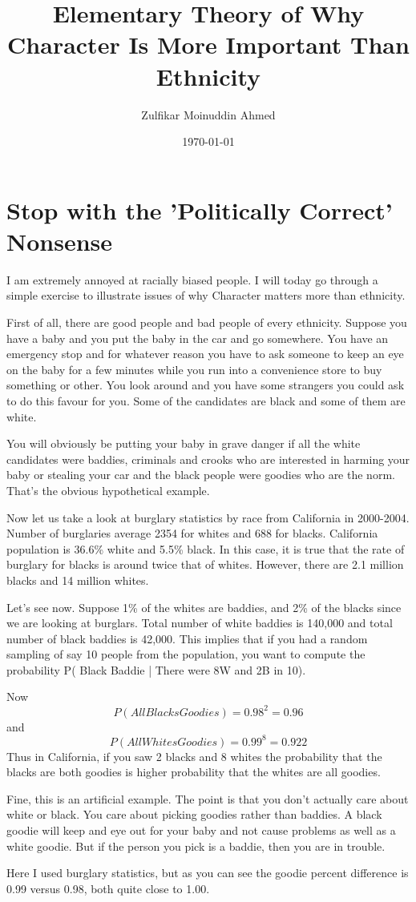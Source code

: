 \documentclass{amsart}
\title{Elementary Theory of Why Character Is More Important Than Ethnicity}
\author{Zulfikar Moinuddin Ahmed}
\date{\today}
\begin{document}
\maketitle

\section{Stop with the 'Politically Correct' Nonsense}

I am extremely annoyed at racially biased people.  I will today go through a simple exercise to illustrate issues of why Character matters more than ethnicity.

First of all, there are good people and bad people of every ethnicity.  Suppose you have a baby and you put the baby in the car and go somewhere.  You have an emergency stop and for whatever reason you have to ask someone to keep an eye on the baby for a few minutes while you run into a convenience store to buy something or other.  You look around and you have some strangers you could ask to do this favour for you.  Some of the candidates are black and some of them are white.  

You will obviously be putting your baby in grave danger if all the white candidates were baddies, criminals and crooks who are interested in harming your baby or stealing your car and the black people were goodies who are the norm.  That's the obvious hypothetical example.  

Now let us take a look at burglary statistics by race from California in 2000-2004. Number of burglaries average 2354 for whites and 688 for blacks.  California population is 36.6\% white and 5.5\% black.  In this case, it is true that the rate of burglary for blacks is around twice that of whites.  However, there are 2.1 million blacks and 14 million whites.

Let's see now.  Suppose 1\% of the whites are baddies, and 2\% of the blacks since we are looking at burglars.  Total number of white baddies is 140,000 and total number of black baddies is 42,000.  This implies that if you had a random sampling of say 10 people from the population, you want to compute the probability P( Black Baddie | There were 8W and 2B in 10).

Now
\[
P( All Blacks Goodies ) = 0.98^2 = 0.96
\]
and
\[
P( All Whites Goodies ) = 0.99^8 = 0.922
\]
Thus in California, if you saw 2 blacks and 8 whites the probability that the blacks are both goodies is higher probability that the whites are all goodies.

Fine, this is an artificial example.  The point is that you don't actually care about white or black. You care about picking goodies rather than baddies.  A black goodie will keep and eye out for your baby and not cause problems as well as a white goodie.  But if the person you pick is a baddie, then you are in trouble.  

Here I used burglary statistics, but as you can see the goodie percent difference is 0.99 versus 0.98, both quite close to 1.00.
\end{document}
